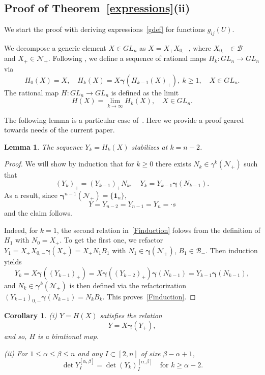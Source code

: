\documentclass{amsart}
\newtheorem{lemma}[theorem]{Lemma}
\newtheorem{corollary}[theorem]{Corollary}
\theoremstyle{definition}
\theoremstyle{remark}
\numberwithin{equation}{section}
\numberwithin{theorem}{section}
\def\B{{\mathcal B}}
\def\N{\mathcal N}
\def\bgamma{\pmb\gamma}
\def\one{\mathbf 1}
\begin{document}
\subsection{Proof of Theorem~\ref{expressions}(ii)}\label{badgproof}
 We start the proof with deriving expressions~\eqref{gdef} for functions $g_{ij}(U)$. 

We decompose a generic element $X \in GL_n$ as $X = X_+ X_{0,-}$, where $X_{0,-} \in \B_-$ and  $X_+ \in \N_+$. Following \cite[Section 7.1]{GV}, we define a sequence of rational maps $H_{k}: GL_n \to GL_n$ via
\begin{equation}
\label{Fmaps}
    H_0(X) = X, \quad  H_{k}(X) = X\bgamma(H_{k-1}(X)_+), \ k \geq 1, \quad  X \in GL_n.
\end{equation}
The rational map $H : GL_n \to GL_n$ is defined as the limit 
\begin{equation}\label{eq:fdefg}
H(X) = \lim_{k\rightarrow \infty}H_k(X), \quad X \in GL_n.
\end{equation}

The following lemma is a particular case of~\cite[Lemma 4.6]{GV}. Here we provide a proof geared towards needs of the current paper.

\begin{lemma}
\label{lemma:Fstable}
The sequence $Y_k=H_k(X)$ stabilizes at $k = n-2$. 
\end{lemma}


\begin{proof} We will show by induction that for $k\ge0$ there exists $N_k \in \gamma^{k}(\N_+)$ such that
\begin{equation}\label{Finduction}
(Y_k)_+= (Y_{k-1})_+ N_k,\quad Y_k= Y_{k-1}\bgamma(N_{k-1}).
\end{equation}
As a result, since $\bgamma^{n-1}(\N_+)=\{ \one_n\}$,
\[
Y=Y_{n-2}=Y_{n-1} = Y_{n}= {\cdot}s
\]
and the claim follows.

Indeed, for $k=1$, the second relation in~\eqref{Finduction} folows from the definition of $H_1$ with $N_0=X_+$. To get the
first one, we refactor $Y_1= X_+ X_{0,-} \bgamma(X_+)=X_+ N_1 B_1$
with $N_1 \in \bgamma(\N_+)$, $B_1\in\B_-$.  Then induction yields
\[
Y_{k} = X\bgamma((Y_{k-1})_+)= 
X\bgamma((Y_{k-2})_+)\bgamma(N_{k-1})=Y_{k-1} \bgamma(N_{k-1}),
\]
and $N_k\in \bgamma^{k}(\N_+)$ is then defined via the refactorization $(Y_{k-1})_{0,-} \bgamma(N_{k-1}) = N_{k} B_k$. This proves~\eqref{Finduction}.
\end{proof}

\begin{corollary}\label{cor:Fprincipal}
{\rm (i)}  $Y=H(X)$ satisfies the relation
\begin{equation*}%
Y = X\bgamma(Y_+),
\end{equation*}
and  so, $H$ is a birational map.

{\rm(ii)} For $1\leq \alpha\leq \beta\leq n$ and any $I\subset [2,n]$ of size $\beta - \alpha + 1$,
\begin{equation}
\label{eq:fstability}
\det Y_{I}^{[\alpha,\beta]} = \det (Y_k)_{I}^{[\alpha,\beta]}\quad\text{for $k\geq \alpha-2$}.
\end{equation}
\end{corollary}
\end{document}
